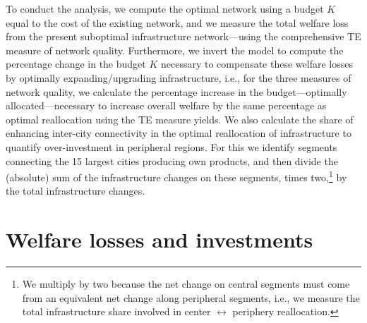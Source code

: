 \documentclass[a4paper]{article}
\begin{document}


To conduct the analysis, we compute the optimal network using a budget $K$ equal to the cost of the existing network, and we measure the total welfare loss from the present suboptimal infrastructure network---using the comprehensive TE measure of network quality. Furthermore, we invert the model to compute the percentage change in the budget $K$ necessary to compensate these welfare losses by optimally expanding/upgrading infrastructure, i.e., for the three measures of network quality, we calculate the percentage increase in the budget---optimally allocated---necessary to increase overall welfare by the same percentage as optimal reallocation using the TE measure yields. We also calculate the share of enhancing inter-city connectivity in the optimal reallocation of infrastructure to quantify over-investment in peripheral regions. For this we identify segments connecting the 15 largest cities producing own products, and then divide the (absolute) sum of the infrastructure changes on these segments, times two,\footnote{We multiply by two because the net change on central segments must come from an equivalent net change along peripheral segments, i.e., we measure the total infrastructure share involved in center $\longleftrightarrow$ periphery reallocation.} by the total infrastructure changes.   

\section{Welfare losses and investments}
\end{document}
